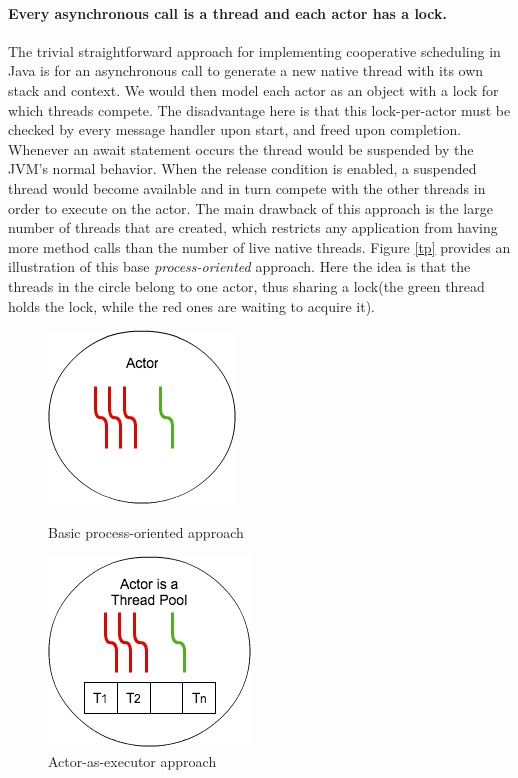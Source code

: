 \paragraph{Every asynchronous call is a thread and each actor has a lock.}
The trivial straightforward approach for implementing cooperative scheduling in Java is for an asynchronous call to generate a new native thread with its own stack and context. We would then model each actor as an object with a lock for which threads compete. The disadvantage here is that this lock-per-actor must be checked by every message handler upon start, and freed upon completion. Whenever an await statement occurs the thread would be suspended by the JVM's normal behavior. When the release condition is enabled, a suspended thread would become available and in turn compete with the other threads in order to execute on the actor. The main drawback of this approach is the large number of threads that are created, which restricts any application from having more method calls than the number of live native threads. Figure \ref{tp} provides an illustration of this base \textit{process-oriented} approach. Here the idea is that the threads in the circle belong to one actor, thus sharing a lock(the green thread holds the lock, while the red ones are waiting to acquire it).

\begin{figure}
	\centering
	\begin{minipage}{.47\textwidth}
		\centering
		\includegraphics[scale=0.58]{mt.png}
		\caption{Basic process-oriented approach}
		\label{tp}
	\end{minipage}
	\begin{minipage}{.52\textwidth}
		\centering
		\includegraphics[scale=0.63]{atp.png}
		\caption{Actor-as-executor approach}
		\label{atp}	
	\end{minipage}
\end{figure}

